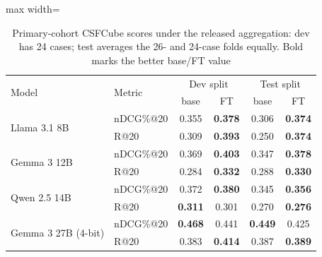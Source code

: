 \documentclass[pdflatex,sn-basic,Numbered]{sn-jnl}%
\theoremstyle{thmstyleone}%
\theoremstyle{thmstyletwo}%
\theoremstyle{thmstylethree}%
\begin{document}
\begin{table}[ht]


\centering
\renewcommand{\arraystretch}{1.1}
\setlength{\tabcolsep}{4pt}
\footnotesize
\begin{adjustbox}{max width=\linewidth}
\begin{tabular}{l l c c c c}
\hline
\multirow{2}{*}{Model} & \multirow{2}{*}{Metric}
 & \multicolumn{2}{c}{Dev split} & \multicolumn{2}{c}{Test split} \\
 & & base & FT & base & FT \\
\hline
\multirow{2}{*}{Llama 3.1 8B}
  & nDCG\%@20 & 0.355 & \textbf{0.378} & 0.306 & \textbf{0.374} \\
  & R@20      & 0.309 & \textbf{0.393} & 0.250 & \textbf{0.374} \\
\hline
\multirow{2}{*}{Gemma 3 12B}
  & nDCG\%@20 & 0.369 & \textbf{0.403} & 0.347 & \textbf{0.378} \\
  & R@20      & 0.284 & \textbf{0.332} & 0.288 & \textbf{0.330} \\
\hline
\multirow{2}{*}{Qwen 2.5 14B}
  & nDCG\%@20 & 0.372 & \textbf{0.380} & 0.345 & \textbf{0.356} \\
  & R@20      & \textbf{0.311} & 0.301 & 0.270 & \textbf{0.276} \\
\hline
\multirow{2}{*}{Gemma 3 27B (4-bit)}
  & nDCG\%@20 & \textbf{0.468} & 0.441 & \textbf{0.449} & 0.425 \\
  & R@20      & 0.383 & \textbf{0.414} & 0.387 & \textbf{0.389} \\
\hline
\end{tabular}
\end{adjustbox}



\caption{Primary-cohort CSFCube scores under the released aggregation: dev has 24 cases; test averages the 26- and 24-case folds equally. Bold marks the better base/FT value}
\label{tab:csfcube}
\end{table}
\end{document}
